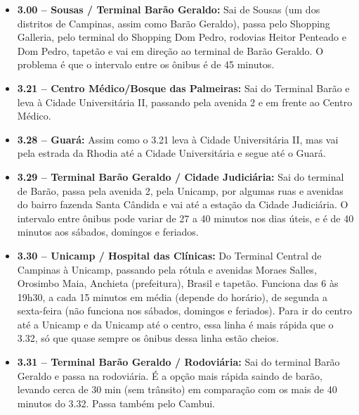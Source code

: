 \begin{itemize}
\item  \textbf{3.00 -- Sousas / Terminal Barão Geraldo:} Sai de Sousas (um dos distritos de Campinas, assim como Barão Geraldo), passa pelo Shopping Galleria, pelo terminal do Shopping Dom Pedro, rodovias Heitor Penteado e Dom Pedro, tapetão e vai em direção ao terminal de Barão Geraldo. O problema é que o intervalo entre os ônibus é de 45 minutos.
\end{itemize}

\begin{itemize}
\item  \textbf{3.21 -- Centro Médico/Bosque das Palmeiras:} Sai do Terminal Barão e leva à Cidade Universitária II, passando pela avenida 2 e em frente ao Centro Médico.
\end{itemize}

\begin{itemize}
\item  \textbf{3.28 -- Guará:} Assim como o 3.21 leva à Cidade Universitária II, mas vai pela estrada da Rhodia até a Cidade Universitária e segue até o Guará.
\end{itemize}

\begin{itemize}
\item  \textbf{3.29 -- Terminal Barão Geraldo / Cidade Judiciária:} Sai do terminal de Barão, passa pela avenida 2, pela Unicamp, por algumas ruas e avenidas do bairro fazenda Santa Cândida e vai até a estação da Cidade Judiciária. O intervalo entre ônibus pode variar de 27 a 40 minutos nos dias úteis, e é de 40 minutos aos sábados, domingos e feriados.
\end{itemize}

\begin{itemize}
\item  \textbf{3.30 -- Unicamp / Hospital das Clínicas:} Do Terminal Central de Campinas à Unicamp, passando pela rótula e avenidas Moraes Salles, Orosimbo Maia, Anchieta (prefeitura), Brasil e tapetão. Funciona das 6 às 19h30, a cada 15 minutos em média (depende do horário), de segunda a sexta-feira (não funciona nos sábados, domingos e feriados). Para ir do centro até a Unicamp e da Unicamp até o centro, essa linha é mais rápida que o 3.32, só que quase sempre os ônibus dessa linha estão cheios.
\end{itemize}

\begin{itemize}
\item  \textbf{3.31 -- Terminal Barão Geraldo / Rodoviária:} Sai do terminal Barão Geraldo e passa na rodoviária. É a opção mais rápida saindo de barão, levando cerca de 30 min (sem trânsito) em comparação com os mais de 40 minutos do 3.32. Passa também pelo Cambui.
\end{itemize}

